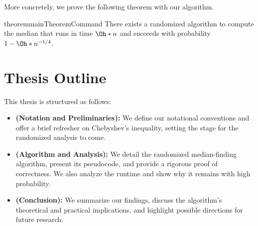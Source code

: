More concretely, we prove the following theorem with our algorithm.

\begin{restatable}{theorem}{mainTheoremCommand}
    \label{theorem:mainTheorem}
    There exists a randomized algorithm to compute the median that runs in time $\Oh*{n}$ and succeeds with probability $1 - \Oh*{n^{-1/4}}$.
\end{restatable}

\section*{Thesis Outline}

This thesis is structured as follows:
\begin{itemize}
    \item \textbf{ (Notation and Preliminaries):} We define our notational conventions and offer a brief refresher on Chebyshev’s inequality, setting the stage for the randomized analysis to come.
    \item \textbf{ (Algorithm and Analysis):} We detail the randomized median-finding algorithm, present its pseudocode, and provide a rigorous proof of correctness. We also analyze the runtime and show why it remains  with high probability.
    \item \textbf{ (Conclusion):} We summarize our findings, discuss the algorithm’s theoretical and practical implications, and highlight possible directions for future research.
\end{itemize}
